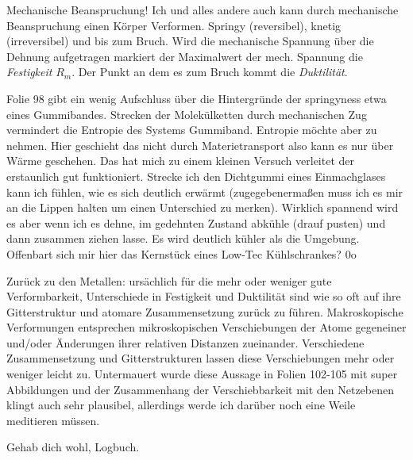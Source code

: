 Mechanische Beanspruchung! Ich und alles andere auch kann durch mechanische Beanspruchung einen Körper
Verformen. Springy (reversibel), knetig (irreversibel) und bis zum Bruch. Wird die mechanische Spannung über
die Dehnung aufgetragen markiert der Maximalwert der mech. Spannung die \textit{Festigkeit} \(R_m\). Der Punkt
an dem es zum Bruch kommt die \textit{Duktilität}.\par
Folie 98 gibt ein wenig Aufschluss über die Hintergründe der springyness etwa eines Gummibandes. Strecken der
Molekülketten durch mechanischen Zug vermindert die Entropie des Systems Gummiband. Entropie möchte aber zu nehmen.
Hier geschieht das nicht durch Materietransport also kann es nur über Wärme geschehen. Das hat mich zu einem
kleinen Versuch verleitet der erstaunlich gut funktioniert. Strecke ich den Dichtgummi eines Einmachglases
kann ich fühlen, wie es sich deutlich erwärmt (zugegebenermaßen muss ich es mir an die Lippen halten um einen
Unterschied zu merken). Wirklich spannend wird es aber wenn ich es dehne, im gedehnten Zustand abkühle (drauf pusten)
und dann zusammen ziehen lasse. Es wird deutlich kühler als die Umgebung. Offenbart sich mir hier das Kernstück
eines Low-Tec Kühlschrankes? 0o\par
Zurück zu den Metallen: ursächlich für die mehr oder weniger gute Verformbarkeit, Unterschiede in Festigkeit und
Duktilität sind wie so oft auf ihre Gitterstruktur und atomare Zusammensetzung zurück zu führen. Makroskopische Verformungen
entsprechen mikroskopischen Verschiebungen der Atome gegeneiner und/oder Änderungen ihrer relativen Distanzen zueinander.
Verschiedene Zusammensetzung und Gitterstrukturen lassen diese Verschiebungen mehr oder weniger leicht zu.
Untermauert wurde diese Aussage in Folien 102-105 mit super Abbildungen und der Zusammenhang der Verschiebbarkeit mit
den Netzebenen klingt auch sehr plausibel, allerdings werde ich darüber noch eine Weile meditieren müssen.

Gehab dich wohl, Logbuch.